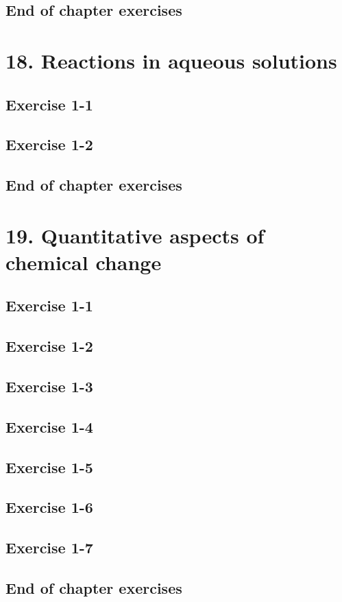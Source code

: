 \subsection{End of chapter exercises}
\section{18. Reactions in aqueous solutions}
\subsection{Exercise 1-1}
\subsection{Exercise 1-2}
\subsection{End of chapter exercises}
\section{19. Quantitative aspects of chemical change}
\subsection{Exercise 1-1}
\subsection{Exercise 1-2}
\subsection{Exercise 1-3}
\subsection{Exercise 1-4}
\subsection{Exercise 1-5}
\subsection{Exercise 1-6}
\subsection{Exercise 1-7}
\subsection{End of chapter exercises}
